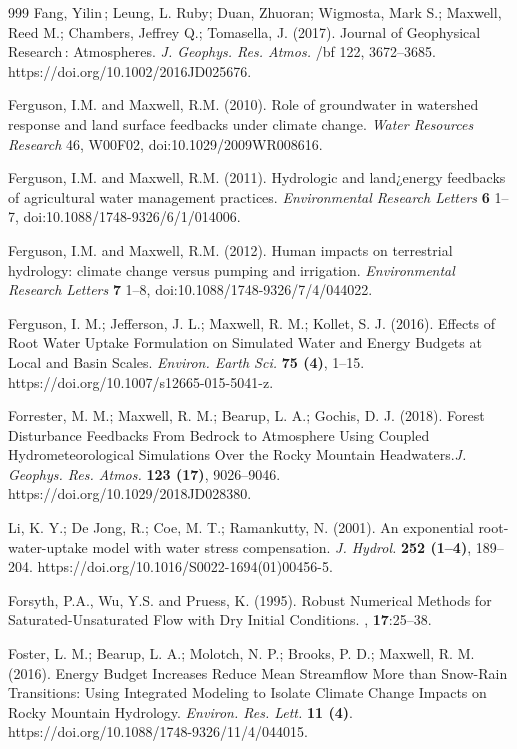 \begin{thebibliography}{999}
Fang, Yilin ; Leung, L. Ruby; Duan, Zhuoran; Wigmosta, Mark S.; Maxwell, Reed M.; Chambers, Jeffrey Q.; Tomasella, J. (2017). Journal of Geophysical Research : Atmospheres. {\em J. Geophys. Res. Atmos.} {/bf 122}, 3672–3685. https://doi.org/10.1002/2016JD025676.

Ferguson, I.M. and Maxwell, R.M. (2010). Role of groundwater in watershed response and land surface feedbacks under climate change. {\em Water Resources Research} 46, W00F02, doi:10.1029/2009WR008616.

Ferguson, I.M. and Maxwell, R.M. (2011). Hydrologic and land¿energy feedbacks of agricultural water management practices. {\em Environmental Research Letters} {\bf 6} 1--7, doi:10.1088/1748-9326/6/1/014006.

Ferguson, I.M. and Maxwell, R.M. (2012). Human impacts on terrestrial hydrology: climate change versus pumping and irrigation. {\em Environmental Research Letters} {\bf 7} 1--8, doi:10.1088/1748-9326/7/4/044022.

Ferguson, I. M.; Jefferson, J. L.; Maxwell, R. M.; Kollet, S. J. (2016). Effects of Root Water Uptake Formulation on Simulated Water and Energy Budgets at Local and Basin Scales. {\em Environ. Earth Sci.} {\bf 75 (4)}, 1–15. https://doi.org/10.1007/s12665-015-5041-z.

Forrester, M. M.; Maxwell, R. M.; Bearup, L. A.; Gochis, D. J. (2018). Forest Disturbance Feedbacks From Bedrock to Atmosphere Using Coupled Hydrometeorological Simulations Over the Rocky Mountain Headwaters.{\em J. Geophys. Res. Atmos.} {\bf 123 (17)}, 9026–9046. https://doi.org/10.1029/2018JD028380.

Li, K. Y.; De Jong, R.; Coe, M. T.; Ramankutty, N. (2001). An exponential root-water-uptake model with water stress compensation. {\em J. Hydrol.} {\bf 252 (1--4)}, 189--204. https://doi.org/10.1016/S0022-1694(01)00456-5.

Forsyth, P.A., Wu, Y.S. and Pruess, K. (1995).
\newblock Robust Numerical Methods for Saturated-Unsaturated Flow with Dry Initial Conditions.
, {\bf 17}:25--38.

Foster, L. M.; Bearup, L. A.; Molotch, N. P.; Brooks, P. D.; Maxwell, R. M. (2016). Energy Budget Increases Reduce Mean Streamflow More than Snow-Rain Transitions: Using Integrated Modeling to Isolate Climate Change Impacts on Rocky Mountain Hydrology. {\em Environ. Res. Lett.} {\bf 11 (4)}. https://doi.org/10.1088/1748-9326/11/4/044015.



\end{thebibliography}
